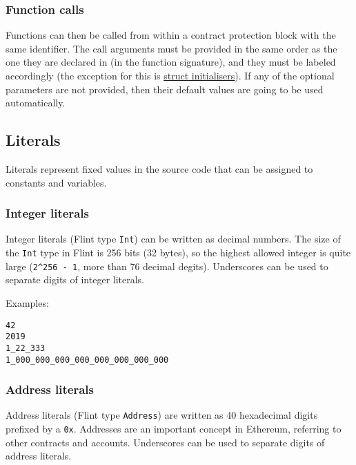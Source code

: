 \subsubsection{Function calls}
\label{sec:appendix-b-function-calls}

Functions can then be called from within a contract protection block with the same identifier. The call arguments must be provided in the same order as the one they are declared in (in the function signature), and they must be labeled accordingly (the exception for this is \hyperref[sec:appendix-b-instances]{struct initialisers}). If any of the optional parameters are not provided, then their default values are going to be used automatically.

\subsection{Literals}
\label{sec:appendix-b-literals}

Literals represent fixed values in the source code that can be assigned to constants and variables.

\subsubsection{Integer literals}
\label{sec:appendix-b-integer-literals}

Integer literals (Flint type \texttt{Int}) can be written as decimal numbers. The size of the \texttt{Int} type in Flint is 256 bits (32 bytes), so the highest allowed integer is quite large (\texttt{2^256 - 1}, more than 76 decimal degits). Underscores can be used to separate digits of integer literals.

Examples:

\begin{verbatim}
42
2019
1_22_333
1_000_000_000_000_000_000_000_000
\end{verbatim}

\subsubsection{Address literals}
\label{sec:appendix-b-address-literals}

Address literals (Flint type \texttt{Address}) are written as 40 hexadecimal digits prefixed by a \texttt{0x}. Addresses are an important concept in Ethereum, referring to other contracts and accounts. Underscores can be used to separate digits of address literals.


